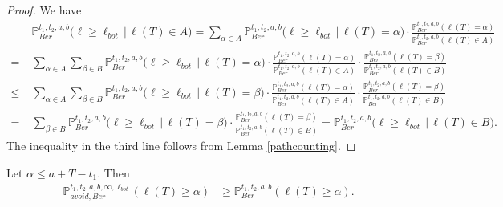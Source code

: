 \begin{proof}
	We have
	\begin{align*}
	& \mathbb{P}^{t_1, t_2, a, b}_{Ber}\big(\ell \geq \ell_{bot}\,\big|\,\ell(T) \in A\big) = \sum_{\alpha\in A} \mathbb{P}^{t_1, t_2, a, b}_{Ber}\big(\ell \geq \ell_{bot}\,\big|\,\ell(T) = \alpha\big) \cdot \frac{\mathbb{P}^{t_1, t_2, a, b}_{Ber}(\ell(T) = \alpha)}{\mathbb{P}^{t_1, t_2, a, b}_{Ber}(\ell(T) \in A)}\\
	= \; & \sum_{\alpha\in A}\sum_{\beta\in B} \mathbb{P}^{t_1, t_2, a, b}_{Ber}\big(\ell \geq \ell_{bot}\,\big|\,\ell(T) = \alpha\big) \cdot \frac{\mathbb{P}^{t_1, t_2, a, b}_{Ber}(\ell(T) = \alpha)}{\mathbb{P}^{t_1, t_2, a, b}_{Ber}(\ell(T) \in A)} \cdot \frac{\mathbb{P}^{t_1, t_2, a, b}_{Ber}(\ell(T) = \beta)}{\mathbb{P}^{t_1, t_2, a, b}_{Ber}(\ell(T) \in B)}\\
	\leq \; & \sum_{\alpha\in A}\sum_{\beta\in B} \mathbb{P}^{t_1, t_2, a, b}_{Ber}\big(\ell \geq \ell_{bot}\,\big|\,\ell(T) = \beta\big) \cdot \frac{\mathbb{P}^{t_1, t_2, a, b}_{Ber}(\ell(T) = \alpha)}{\mathbb{P}^{t_1, t_2, a, b}_{Ber}(\ell(T) \in A)} \cdot \frac{\mathbb{P}^{t_1, t_2, a, b}_{Ber}(\ell(T) = \beta)}{\mathbb{P}^{t_1, t_2, a, b}_{Ber}(\ell(T) \in B)}\\
	= \; & \sum_{\beta \in B} \mathbb{P}^{t_1, t_2, a, b}_{Ber}\big(\ell \geq \ell_{bot}\,\big|\,\ell(T) = \beta\big) \cdot \frac{\mathbb{P}^{t_1, t_2, a, b}_{Ber}(\ell(T) = \beta)}{\mathbb{P}^{t_1, t_2, a, b}_{Ber}(\ell(T) \in B)} = \mathbb{P}^{t_1, t_2, a, b}_{Ber}\big(\ell \geq \ell_{bot}\,\big|\,\ell(T) \in B\big).
	\end{align*}
	The inequality in the third line follows from Lemma \ref{pathcounting}.
\end{proof}

\begin{corollary}\label{freeavoidbound}
	Let $\alpha \leq a + T - t_1$. Then
	\begin{align*}
	\mathbb{P}^{t_1,t_2,a,b,\infty,\ell_{bot}}_{avoid,Ber} (\ell(T)\geq\alpha) &\geq \mathbb{P}^{t_1,t_2,a,b}_{Ber} (\ell(T)\geq \alpha).
	\end{align*}
\end{corollary}

